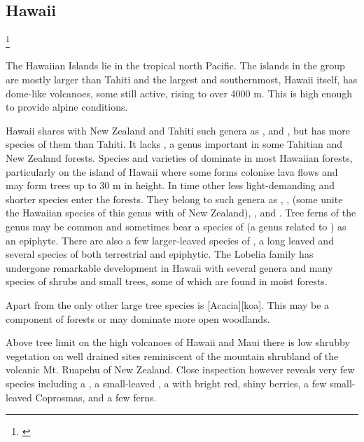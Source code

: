 \subsection{Hawai{\okina}i}\footnote{\cite{carlquist1970hawaii}}

The Hawaiian Islands lie in the tropical north Pacific.
The islands in the group are mostly larger than Tahiti and the largest and southernmost, Hawai{\okina}i itself, has dome-like volcanoes, some still active, rising to over 4000 m.
This is high enough to provide alpine conditions.

Hawai{\okina}i shares with New Zealand and Tahiti such genera as ,  and , but has more species of them than Tahiti.
It lacks , a genus important in some Tahitian and New Zealand forests.
Species and varieties of  dominate in most Hawaiian forests, particularly on the island of Hawai{\okina}i where some forms colonise lava flows and may form trees up to 30 m in height.
In time other less light-demanding and shorter species enter the forests.
They belong to such genera as , ,  (some unite the Hawaiian species of this genus with  of New Zealand), ,  and .
Tree ferns of the genus  may be common and sometimes bear a species of  (a genus related to ) as an epiphyte.
There are also a few larger-leaved species of , a long leaved  and several species of  both terrestrial and epiphytic.
The Lobelia family has undergone remarkable development in Hawai{\okina}i with several genera and many species of shrubs and small trees, some of which are found in moist forests.

Apart from  the only other large tree species is [Acacia][koa].
This may be a component of  forests or may dominate more open woodlands.

Above tree limit on the high volcanoes of Hawai{\okina}i and Maui there is low shrubby vegetation on well drained sites reminiscent of the mountain shrubland of the volcanic Mt.
Ruapehu of New Zealand.
Close inspection however reveals very few species including a , a small-leaved , a  with bright red, shiny berries, a few small-leaved Coprosmas, and a few ferns.

